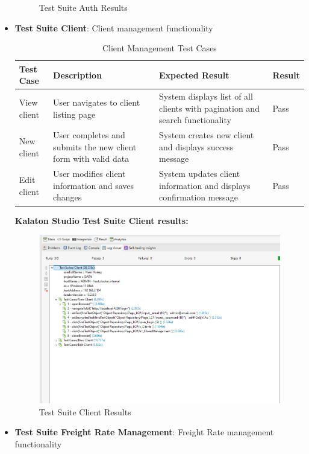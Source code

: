 \begin{itemize}
\begin{figure}[H]
    \caption{Test Suite Auth Results}
    \label{fig:test_suite_auth}
  \end{figure}
  \item \textbf{Test Suite Client}: Client management functionality
  \begin{table}[H]
  \centering
  \caption{Client Management Test Cases}
  \begin{tabular}{|p{4cm}|p{5cm}|p{4cm}|p{1cm}|}
  \hline
  \textbf{Test Case} & \textbf{Description} & \textbf{Expected Result} & \textbf{Result} \\
  \hline
  View client & User navigates to client listing page & System displays list of all clients with pagination and search functionality & Pass \\
  \hline
  New client & User completes and submits the new client form with valid data & System creates new client and displays success message & Pass \\
  \hline
  Edit client & User modifies client information and saves changes & System updates client information and displays confirmation message & Pass \\
  \hline
  \end{tabular}
  \label{tab:client_tests}
  \end{table}
  \textbf{Kalaton Studio Test Suite Client results:} 
  \begin{figure}[H]
    \centering
    \includegraphics[width=15cm]{graphics/chapter6/test_suite_client.png}
    \caption{Test Suite Client Results}
    \label{fig:test_suite_client}
  \end{figure}
  \item \textbf{Test Suite Freight Rate Management}: Freight Rate management functionality

\end{itemize}
